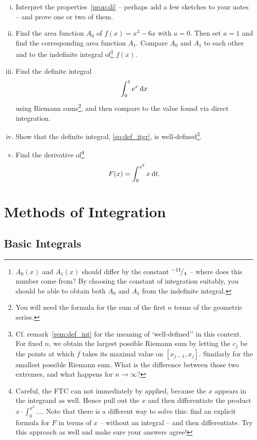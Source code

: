 \begin{exercise}
\begin{enumerate}[(i)]
	\item Interpret the properties~\ref{prop:di} -- perhaps add a few sketches to your notes -- and prove one or two of them.
	\item Find the area function $A_0$ of $f(x)=x^3-6x$ with $a=0$. Then set $a=1$ and find the corresponding area function $A_1$. Compare $A_0$ and $A_1$ to each other and to the indefinite integral of\footnote{$A_0(x)$ and $A_1(x)$ should differ by the constant ${}^{-11}\!/_{4}$ -- where does this number come from? By choosing the constant of integration suitably, you should be able to obtain both $A_0$ and $A_1$ from the indefinite integral.} $f(x)$.
	\item Find the definite integral
	\[ \int_{0}^{1} \mathrm{e}^x \: \mathrm{d} x \]
	using Riemann sums\footnote{You will need the formula for the sum of the first $n$ terms of the geometric series.}, and then compare to the value found via direct integration.
	\item Show that the definite integral, \eqref{eq:def_itgr}, is well-defined\footnote{Cf. remark~\ref{rem:def_int} for the meaning of `well-defined'' in this context. For fixed $n$, we obtain the largest possible Riemann sum by letting the $c_j$ be the points at which $f$ takes its maximal value on $[x_{j-1},x_j]$. Similarly for the smallest possible Riemann sum. What is the difference between those two extremes, and what happens for $n\to\infty$?}.
	\item Find the derivative of\footnote{Careful, the FTC can not immediately by applied, because the $x$ appears in the integrand as well. Hence pull out the $x$ and then differentiate the product $x \cdot \int_0^{x^2}\dots$. Note that there is a different way to solve this: find an explicit formula for $F$ in terms of $x$ -- without an integral -- and then differentiate. Try this approach as well and make sure your answers agree!}
	\[ F(x) = \int_{0}^{x^2} x \: \mathrm{d} t. \]
\end{enumerate}
\end{exercise}


\section{Methods of Integration}

\subsection{Basic Integrals}

